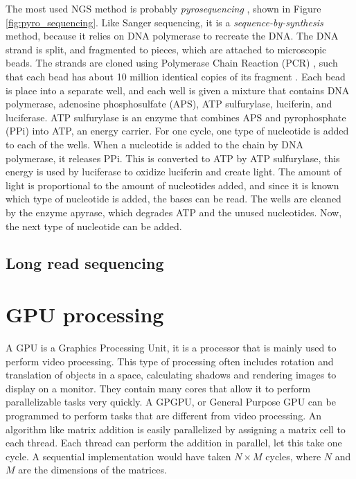\documentclass[../main/thesis.tex]{subfiles}
\begin{document}
The most used NGS method is probably \textit{pyrosequencing} \cite{pyro_sequencing1}, shown in Figure \ref{fig:pyro_sequencing}.
Like Sanger sequencing, it is a \textit{sequence-by-synthesis} method, because it relies on DNA polymerase to recreate the DNA.
The DNA strand is split, and fragmented to pieces, which are attached to microscopic beads.
The strands are cloned using Polymerase Chain Reaction (PCR) \cite{dna_cloning}, such that each bead has about 10 million identical copies of its fragment \cite{pyro_sequencing2}.
Each bead is place into a separate well, and each well is given a mixture that contains DNA polymerase, adenosine phosphosulfate (APS), ATP sulfurylase, luciferin, and luciferase.
ATP sulfurylase is an enzyme that combines APS and pyrophosphate (PPi) into ATP, an energy carrier.
For one cycle, one type of nucleotide is added to each of the wells.
When a nucleotide is added to the chain by DNA polymerase, it releases PPi.
This is converted to ATP by ATP sulfurylase, this energy is used by luciferase to oxidize luciferin and create light.
The amount of light is proportional to the amount of nucleotides added, and since it is known which type of nucleotide is added, the bases can be read.
The wells are cleaned by the enzyme apyrase, which degrades ATP and the unused nucleotides.
Now, the next type of nucleotide can be added.


\subsection{Long read sequencing}




\section{GPU processing}


A GPU is a Graphics Processing Unit, it is a processor that is mainly used to perform video processing.
This type of processing often includes rotation and translation of objects in a space, calculating shadows and rendering images to display on a monitor.
They contain many cores that allow it to perform parallelizable tasks very quickly.
A GPGPU, or General Purpose GPU can be programmed to perform tasks that are different from video processing.
An algorithm like matrix addition is easily parallelized by assigning a matrix cell to each thread.
Each thread can perform the addition in parallel, let this take one cycle.
A sequential implementation would have taken $N\times M$ cycles, where $N$ and $M$ are the dimensions of the matrices.
\end{document}
